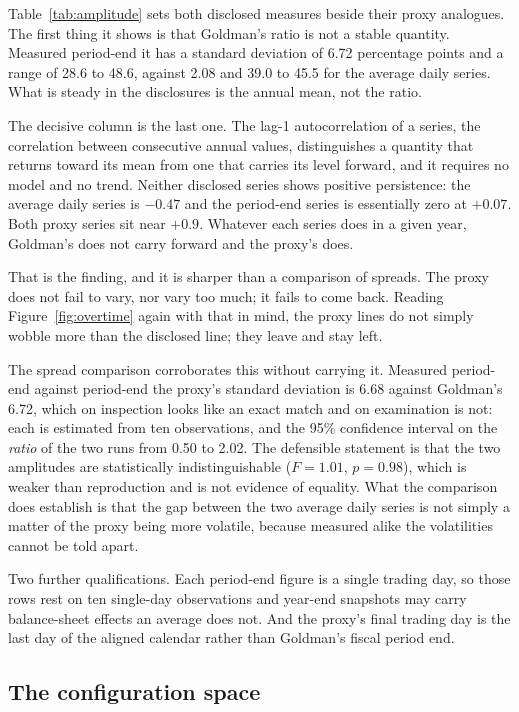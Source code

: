 Table~\ref{tab:amplitude} sets both disclosed measures beside their proxy
analogues. The first thing it shows is that Goldman's ratio is not a stable
quantity. Measured period-end it has a standard deviation of 6.72 percentage
points and a range of 28.6 to 48.6, against 2.08 and 39.0 to 45.5 for the
average daily series. What is steady in the disclosures is the annual mean, not
the ratio.

The decisive column is the last one. The lag-1 autocorrelation of a series,
the correlation between consecutive annual values, distinguishes a quantity
that returns toward its mean from one that carries its level forward, and it
requires no model and no trend. Neither disclosed series shows positive
persistence: the average daily series is $-0.47$ and the period-end series is
essentially zero at $+0.07$. Both proxy series sit near $+0.9$. Whatever each
series does in a given year, Goldman's does not carry forward and the proxy's
does.

That is the finding, and it is sharper than a comparison of spreads. The proxy
does not fail to vary, nor vary too much; it fails to come back. Reading
Figure~\ref{fig:overtime} again with that in mind, the proxy lines do not
simply wobble more than the disclosed line; they leave and stay left.

The spread comparison corroborates this without carrying it. Measured
period-end against period-end the proxy's standard deviation is 6.68 against
Goldman's 6.72, which on inspection looks like an exact match and on
examination is not: each is estimated from ten observations, and the 95\%
confidence interval on the \emph{ratio} of the two runs from 0.50 to 2.02. The
defensible statement is that the two amplitudes are statistically
indistinguishable ($F = 1.01$, $p = 0.98$), which is weaker than reproduction
and is not evidence of equality. What the comparison does establish is that the
gap between the two average daily series is not simply a matter of the proxy
being more volatile, because measured alike the volatilities cannot be told
apart.

Two further qualifications. Each period-end figure is a single trading day, so
those rows rest on ten single-day observations and year-end snapshots may carry
balance-sheet effects an average does not. And the proxy's final trading day is
the last day of the aligned calendar rather than Goldman's fiscal period end.

\subsection{The configuration space}

